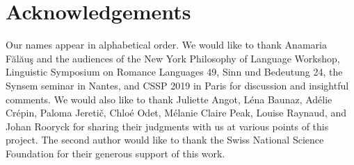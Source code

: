 \documentclass[output=paper]{langscibook}
\begin{document}
\section*{Acknowledgements}
Our names appear in alphabetical order. We would like to thank Anamaria F\u{a}l\u{a}u\c{s} and the audiences of the New York Philosophy of Language Workshop, Linguistic Symposium on Romance Languages 49, Sinn und Bedeutung 24, the Synsem seminar in Nantes, and CSSP 2019 in Paris for discussion and insightful comments. We would also like to thank Juliette Angot, Léna Baunaz, Adélie Crépin, Paloma Jereti\v{c}, Chloé Odet, Mélanie Claire Peak, Louise Raynaud, and Johan Rooryck  for sharing their  judgments with us at various points of this project. The second author would like to thank the Swiss National Science Foundation for their generous support of this work. 

\printbibliography[heading=subbibliography,notkeyword=this]

\end{document}
